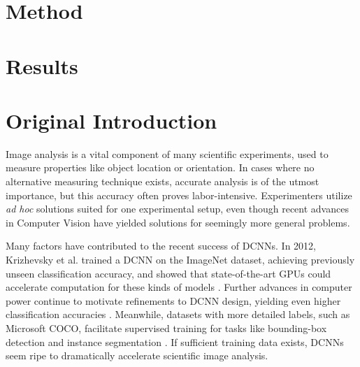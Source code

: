 \documentclass[10pt, draftcls]{IEEEtran}
\begin{document}
\section{Method}
\label{sec:method}

\section{Results}
\label{sec:results}



\section{Original Introduction}
\label{sec:orig-intr}


Image analysis is a vital component of many scientific experiments, used to
measure properties like object location or orientation. In cases where no
alternative measuring technique exists, accurate analysis is of the utmost
importance, but this accuracy often proves labor-intensive. Experimenters
utilize \emph{ad hoc} solutions suited for one experimental setup, even though
recent advances in Computer Vision have yielded solutions for seemingly more
general problems.

Many factors have contributed to the recent success of DCNNs. In 2012,
Krizhevsky et al. trained a DCNN on the ImageNet dataset, achieving previously
unseen classification accuracy, and showed that state-of-the-art GPUs could
accelerate computation for these kinds of models \cite{krizhevsky_imagenet_2012,
  deng_imagenet:_nodate}. Further advances in computer power continue to
motivate refinements to DCNN design, yielding even higher classification
accuracies \cite{simonyan_very_2014, szegedy_going_2014,
  he_deep_2015}. Meanwhile, datasets with more detailed labels, such as
Microsoft COCO, facilitate supervised training for tasks like bounding-box
detection and instance segmentation \cite{lin_microsoft_2014}. If sufficient
training data exists, DCNNs seem ripe to dramatically accelerate scientific
image analysis.
\end{document}
